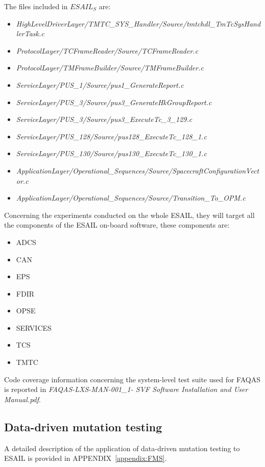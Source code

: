 \STARTCHANGEDNOV
The files included in $\mathit{ESAIL}_S$ are:
\begin{itemize}
\item \emph{HighLevelDriverLayer/TMTC\_SYS\_Handler/Source/tmtchdl\_TmTcSysHandlerTask.c}
\item \emph{ProtocolLayer/TCFrameReader/Source/TCFrameReader.c}
\item \emph{ProtocolLayer/TMFrameBuilder/Source/TMFrameBuilder.c}
\item \emph{ServiceLayer/PUS\_1/Source/pus1\_GenerateReport.c}
\item \emph{ServiceLayer/PUS\_3/Source/pus3\_GenerateHkGroupReport.c}
\item \emph{ServiceLayer/PUS\_3/Source/pus3\_ExecuteTc\_3\_129.c}
\item \emph{ServiceLayer/PUS\_128/Source/pus128\_ExecuteTc\_128\_1.c}
\item \emph{ServiceLayer/PUS\_130/Source/pus130\_ExecuteTc\_130\_1.c}
\item \emph{ApplicationLayer/Operational\_Sequences/Source/SpacecraftConfigurationVector.c}
\item \emph{ApplicationLayer/Operational\_Sequences/Source/Transition\_To\_OPM.c}
\end{itemize}
\ENDCHANGEDNOV

Concerning the experiments conducted on the whole ESAIL, they will target all the components of the ESAIL on-board software, these components are:

\begin{itemize}
	\item ADCS
	\item CAN
	\item EPS
	\item FDIR
	\item OPSE
	\item SERVICES
	\item TCS
	\item TMTC
\end{itemize}

Code coverage information concerning the system-level test suite used for FAQAS is reported in \emph{FAQAS-LXS-MAN-001\_1- SVF Software Installation and User Manual.pdf}.


\subsection{Data-driven mutation testing}

A detailed description of the application of data-driven mutation testing to ESAIL is provided in APPENDIX~\ref{appendix:FMS}.


